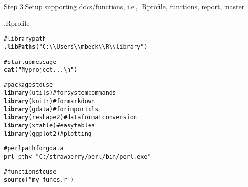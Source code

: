\documentclass[xcolor=svgnames]{beamer}\usepackage{graphicx, color}
\makeatletter
\newcommand{\hlfunctioncall}[1]{\textcolor[rgb]{0.501960784313725,0,0.329411764705882}{\textbf{#1}}}%
\newcommand{\hlstring}[1]{\textcolor[rgb]{0.6,0.6,1}{#1}}%
\newcommand{\hlcomment}[1]{\textcolor[rgb]{0.180392156862745,0.6,0.341176470588235}{#1}}%
\newenvironment{kframe}{%
 \def\at@end@of@kframe{}%
 \ifinner\ifhmode%
  \def\at@end@of@kframe{\end{minipage}}%
  \begin{minipage}{\columnwidth}%
 \fi\fi%
 \def\FrameCommand##1{\hskip\@totalleftmargin \hskip-\fboxsep
 \colorbox{shadecolor}{##1}\hskip-\fboxsep
     \hskip-\linewidth \hskip-\@totalleftmargin \hskip\columnwidth}%
 \MakeFramed {\advance\hsize-\width
   \@totalleftmargin\z@ \linewidth\hsize
   \@setminipage}}%
 {\par\unskip\endMakeFramed%
 \at@end@of@kframe}
\newenvironment{knitrout}{}{} %
\makeatother
\begin{document}
\begin{frame}[fragile]{Step 3}
Setup supporting docs/functions, i.e., .Rprofile, functions, report, master
\scriptsize
\begin{block}{.Rprofile}
\begin{knitrout}
\color{fgcolor}\begin{kframe}
\begin{alltt}
\hlcomment{# library path}
\hlfunctioncall{.libPaths}(\hlstring{"C:\textbackslash{}\textbackslash{}Users\textbackslash{}\textbackslash{}mbeck\textbackslash{}\textbackslash{}R\textbackslash{}\textbackslash{}library"})

\hlcomment{# startup message}
\hlfunctioncall{cat}(\hlstring{"My project...\textbackslash{}n"})

\hlcomment{# packages to use}
\hlfunctioncall{library}(utils)  \hlcomment{# for system commands}
\hlfunctioncall{library}(knitr)  \hlcomment{# for markdown}
\hlfunctioncall{library}(gdata)  \hlcomment{# for import xls}
\hlfunctioncall{library}(reshape2)  \hlcomment{# data format conversion}
\hlfunctioncall{library}(xtable)  \hlcomment{# easy tables}
\hlfunctioncall{library}(ggplot2)  \hlcomment{# plotting}

\hlcomment{# perl path for gdata}
prl_pth <- \hlstring{"C:/strawberry/perl/bin/perl.exe"}

\hlcomment{# functions to use}
\hlfunctioncall{source}(\hlstring{"my_funcs.r"})
\end{alltt}
\end{kframe}
\end{knitrout}

\end{block}
\end{frame}
\end{document}
